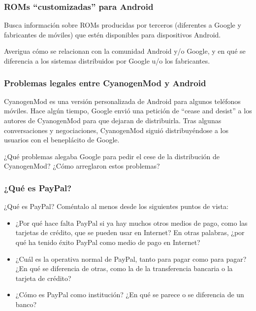 \documentclass[a4paper,12pt]{article}
\begin{document}
\subsubsection{ROMs ``customizadas'' para Android}
\label{sec:roms-cust-para}

Busca información sobre ROMs producidas por terceros (diferentes a
Google y fabricantes de móviles) que estén disponibles para
dispositivos Android.

Averigua cómo se relacionan con la comunidad Android y/o Google, y en
qué se diferencia a los sistemas distribuidos por Google u/o los
fabricantes.

\subsubsection{Problemas legales entre CyanogenMod y Android}
\label{sec:probl-legal-entre}

CyanogenMod es una versión personalizada de Android para algunos
teléfonos móviles. Hace algún tiempo, Google envió una petición de
``cease and desist'' a los autores de CyanogenMod para que dejaran de
distribuirla. Tras algunas conversaciones y negociaciones, CyanogenMod
siguió distribuyéndose a los usuarios con el beneplácito de Google.

¿Qué problemas alegaba Google para pedir el cese de la distribución de
CyanogenMod? ¿Cómo arreglaron estos problemas?

\subsubsection{¿Qué es PayPal?}
\label{sub:paypal-quees}

¿Qué es PayPal? Coméntalo al menos desde los siguientes puntos de vista:

\begin{itemize}
\item ¿Por qué hace falta PayPal si ya hay muchos otros medios de pago, como las tarjetas de crédito, que se pueden usar en Internet? En otras palabras, ¿por qué ha tenido éxito PayPal como medio de pago en Internet?
\item ¿Cuál es la operativa normal de PayPal, tanto para pagar como para pagar? ¿En qué se diferencia de otras, como la de la transferencia bancaria o la tarjeta de crédito?
\item ¿Cómo es PayPal como institución? ¿En qué se parece o se diferencia de un banco?
\end{itemize}
\end{document}
